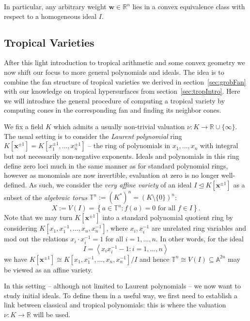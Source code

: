 \documentclass[
  paper=a4,
  titlepage,
  bibliography=totoc,
  listof=totoc,
  pagesize=pdftex
]{scrartcl}
\numberwithin{figure}{section}
\numberwithin{equation}{section}
\numberwithin{table}{section}
\newcommand*\setR{\mathds{R}}
\newcommand*\setA{\mathds{A}}
\newcommand*\setT{\mathds{T}}
\newcommand*\ideal[1]{\left\langle #1 \right\rangle}
\let\vec\mathbf
\let\idealof\trianglelefteq
\theoremstyle{definition}
\numberwithin{definition}{section}
\begin{document}
In particular, any arbitrary weight $\vec w \in \setR^n$ lies in a convex equivalence
class with respect to a homogeneous ideal $I$.

\subsection{Tropical Varieties}
\label{sec:tropVar}

After this light introduction to tropical arithmetic and some convex geometry we now shift
our focus to more general polynomials and ideals. The idea is to combine the fan structure
of tropical varieties we derived in section~\ref{sec:grobFan} with our knowledge on
tropical hypersurfaces from section~\ref{sec:tropIntro}. Here we will introduce the
general procedure of computing a tropical variety by computing cones in the corresponding
fan and finding its neighbor cones.

We fix a field $K$ which admits a usually non-trivial valuation $\nu : K \to \setR \cup
\{\infty\}$. The usual setting is to consider the \emph{Laurent polynomial} ring $K[\vec
x^{\pm1}] = K[x_1^{\pm1}, \dots, x_n^{\pm1}]$ -- the ring of polynomials in $x_1, \dots,
x_n$ with integral but not necessarily non-negative exponents. Ideals and polynomials in
this ring define zero loci much in the same manner as for standard polynomial rings,
however as monomials are now invertible, evaluation at zero is no longer well-defined. As
such, we consider the \emph{very affine variety} of an ideal $I \idealof K[\vec x^{\pm1}]$
as a subset of the \emph{algebraic torus} $\setT^n := {(K^*)}^n = {(K \setminus
\{0\})}^n$:
\[
  X := V(I) = \left\{ a \in \setT^n : f(a) = 0 \text{ for all $f \in I$} \right\}.
\]
Note that we may turn $K[\vec x^{\pm1}]$ into a standard polynomial quotient ring by
considering $K[x_1,x_1^{-1}, \dots, x_n,x_n^{-1}]$, where $x_i, x_i^{-1}$ are unrelated
ring variables and mod out the relations $x_i\cdot x_i^{-1} = 1$ for all $i=1,\dots,n$.
In other words, for the ideal
\[
  I = \ideal{ x_ix_i^{-1}-1 : i = 1, \dots, n}
\]
we have $K[\vec x^{\pm1}] \cong K[x_1,x_1^{-1}, \dots, x_n,x_n^{-1}]/I$ and hence $\setT^n
\cong V(I) \subseteq \setA^{2n}$ may be viewed as an affine variety.

In this setting -- although not limited to Laurent polynomials -- we now want to study
initial ideals. To define them in a useful way, we first need to establish a link between
classical and tropical polynomials: this is where the valuation $\nu:K\to\setR$ will be
used.
\end{document}

